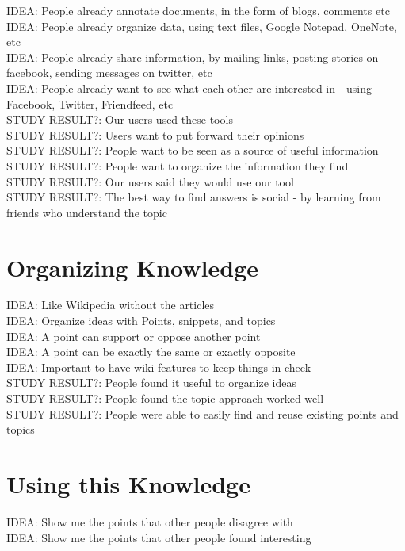 \documentclass{sig-alt-release2}
\newcommand{\idea}[1]{{\color{blue} IDEA: #1}\\}
\newcommand{\studyresult}[1]{{\color{red} STUDY RESULT?: #1}\\}
\begin{document}
\idea{People already annotate documents, in the form of blogs, comments etc}

\idea{People already organize data, using text files, Google Notepad, OneNote, etc}

\idea{People already share information, by mailing links, posting stories on facebook, sending messages on twitter, etc}

\idea{People already want to see what each other are interested in - using Facebook, Twitter, Friendfeed, etc}

\studyresult{Our users used these tools}

\studyresult{Users want to put forward their opinions}

\studyresult{People want to be seen as a source of useful information}

\studyresult{People want to organize the information they find}

\studyresult{Our users said they would use our tool}

\studyresult{The best way to find answers is social - by learning from friends who understand the topic}


\section{Organizing Knowledge}

\idea{Like Wikipedia without the articles}

\idea{Organize ideas with Points, snippets, and topics}

\idea{A point can support or oppose another point}

\idea{A point can be exactly the same or exactly opposite}

\idea{Important to have wiki features to keep things in check}

\studyresult{People found it useful to organize ideas}

\studyresult{People found the topic approach worked well}

\studyresult{People were able to easily find and reuse existing points and topics}


\section{Using this Knowledge}

\idea{Show me the points that other people disagree with}

\idea{Show me the points that other people found interesting}
\end{document}
